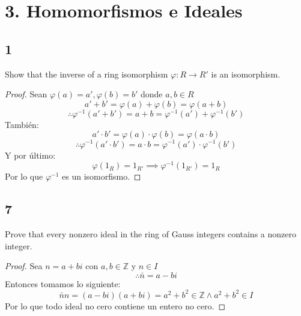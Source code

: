\documentclass[11pt]{article}
\newcommand{\set}[1]{\mathbb{#1}}
\theoremstyle{definition}
\begin{document}
        \section{3. Homomorfismos e Ideales}
        \subsection{1}
        Show that the inverse of a ring isomorphism $\varphi:R\rightarrow R'$ is an isomorphism.
        \begin{proof}
            Sean $\varphi(a)=a',\varphi(b)=b'$ donde $a,b\in R$
            \[a'+b'=\varphi(a)+\varphi(b)=\varphi(a+b)\]
            \[\therefore \varphi^{-1}(a'+b')=a+b=\varphi^{-1}(a')+\varphi^{-1}(b')\]
            También:
            \[a'\cdot b'=\varphi(a)\cdot\varphi(b)=\varphi(a\cdot b)\]
            \[\therefore \varphi^{-1}(a'\cdot b')=a\cdot b=\varphi^{-1}(a')\cdot\varphi^{-1}(b')\]
            Y por último:
            \[\varphi(1_R)=1_{R'}\implies \varphi^{-1}(1_{R'})=1_R\]
            Por lo que $\varphi^{-1}$ es un isomorfismo.
        \end{proof}

        \subsection{7}
        Prove that every nonzero ideal in the ring of Gauss integers contains a nonzero integer.
        \begin{proof}
            Sea $n=a+bi$ con $a,b\in\set{Z}$ y $n\in I$
            \[\therefore \bar{n}=a-bi\]
            Entonces tomamos lo siguiente:
            \[\bar{n}n=(a-bi)(a+bi)=a^2+b^2\in\set{Z}\wedge a^2+b^2\in I\]
            Por lo que todo ideal no cero contiene un entero no cero.
        \end{proof}
\end{document}
